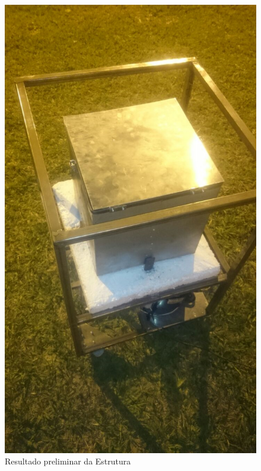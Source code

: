 \begin{figure}[H]
\centering
\includegraphics[width=16cm]{figuras/estruturapreliminar.png}
\caption{Resultado preliminar da Estrutura}
\end{figure}


